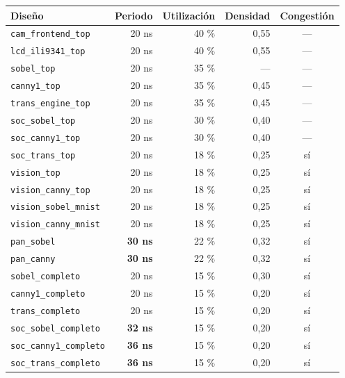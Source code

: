 \begin{longtable}[]{@{}lrrrc@{}}
\toprule\noalign{}
Diseño & Periodo & Utilización & Densidad & Congestión \\
\midrule\noalign{}
\endhead
\bottomrule\noalign{}
\endlastfoot
\texttt{cam\_frontend\_top} & 20 ns & 40 \% & 0,55 & --- \\
\texttt{lcd\_ili9341\_top} & 20 ns & 40 \% & 0,55 & --- \\
\texttt{sobel\_top} & 20 ns & 35 \% & --- & --- \\
\texttt{canny1\_top} & 20 ns & 35 \% & 0,45 & --- \\
\texttt{trans\_engine\_top} & 20 ns & 35 \% & 0,45 & --- \\
\texttt{soc\_sobel\_top} & 20 ns & 30 \% & 0,40 & --- \\
\texttt{soc\_canny1\_top} & 20 ns & 30 \% & 0,40 & --- \\
\texttt{soc\_trans\_top} & 20 ns & 18 \% & 0,25 & sí \\
\texttt{vision\_top} & 20 ns & 18 \% & 0,25 & sí \\
\texttt{vision\_canny\_top} & 20 ns & 18 \% & 0,25 & sí \\
\texttt{vision\_sobel\_mnist} & 20 ns & 18 \% & 0,25 & sí \\
\texttt{vision\_canny\_mnist} & 20 ns & 18 \% & 0,25 & sí \\
\texttt{pan\_sobel} & \textbf{30 ns} & 22 \% & 0,32 & sí \\
\texttt{pan\_canny} & \textbf{30 ns} & 22 \% & 0,32 & sí \\
\texttt{sobel\_completo} & 20 ns & 15 \% & 0,30 & sí \\
\texttt{canny1\_completo} & 20 ns & 15 \% & 0,20 & sí \\
\texttt{trans\_completo} & 20 ns & 15 \% & 0,20 & sí \\
\texttt{soc\_sobel\_completo} & \textbf{32 ns} & 15 \% & 0,20 & sí \\
\texttt{soc\_canny1\_completo} & \textbf{36 ns} & 15 \% & 0,20 & sí \\
\texttt{soc\_trans\_completo} & \textbf{36 ns} & 15 \% & 0,20 & sí \\
\end{longtable}

